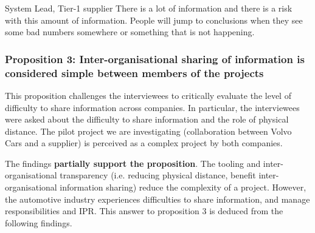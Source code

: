 \begin{aquote}{System Lead, Tier-1 supplier}
There is a lot of information and there is a risk with this amount of information. People will jump to conclusions when they see some bad numbers somewhere or something that is not happening.
\end{aquote}


%


\vspace{.2cm}
\subsubsection{Proposition 3: Inter-organisational sharing of information is considered simple between members of the projects}

This proposition challenges the interviewees to critically evaluate the level of difficulty to share information across companies. In particular, the interviewees were asked about the difficulty to share information and the role of physical distance. The pilot project we are investigating (collaboration between Volvo Cars and a supplier) is perceived as a complex project by both companies. %

The findings {\bf partially support the proposition}. The tooling and inter-organisational transparency (i.e. reducing physical distance, benefit inter-organisational information sharing) reduce the complexity of a project. However, the automotive industry experiences difficulties to share information, and manage responsibilities and IPR. This answer to proposition 3 is deduced from the following findings.

